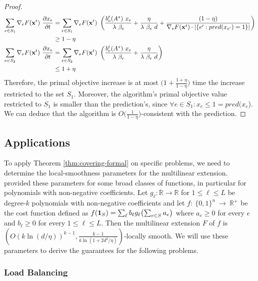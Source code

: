 \begin{proof}
\begin{align*}
\sum_{e \in S_{1}} \nabla_{e} F(\mathbf{x}^{t})\ \frac{\partial x_{e}}{ \partial t}
&= \sum_{e \in S_{1}} \nabla_{e} F(\mathbf{x}^{t})
	\ \left( \frac{b^{t}_{e}(A^{*}) \ x_{e}}{\lambda\ \beta_{e}} + \frac{\eta}{\lambda\ \beta_{e}\ d}
		 + \frac{(1 - \eta)}{\nabla_{e} F(\mathbf{x}^{t}) \cdot |\{e': pred(x_{e'}) = 1\}| }
 \right)\\
 &\geq 1 - \eta \\
 \sum_{e \in S_{2}} \nabla_{e} F(\mathbf{x}^{t})\ \frac{\partial x_{e}}{ \partial t}
&= \sum_{e \in S_{2}} \nabla_{e} F(\mathbf{x}^{t})
	\ \left( \frac{b^{t}_{e}(A^{*}) \ x_{e}}{\lambda\ \beta_{e}} + \frac{\eta}{\lambda\ \beta_{e}\ d} \right)\\
&\leq 1 + \eta
\end{align*}
Therefore, the primal objective increase is at most $\bigl(1 +  \frac{1 + \eta}{1 - \eta} \bigr)$ time the increase restricted to
the set $S_{1}$. Moreover, the algorithm's primal objective value restricted to $S_{1}$ is smaller than
the prediction's, since $\forall e \in S_{1} : x_{e} \leq 1 = pred(x_{e}$).
We can deduce that the algorithm is $O\bigl( \frac{1}{1 - \eta} \bigr)$-consistent with the prediction.
\end{proof}
\setcounter{theorem}{5}

\subsection{Applications}
To apply Theorem \ref{thm:covering-formal} on specific problems, we need to determine the local-smoothness parameters for the multilinear extension.
\cite{Thang20:Online-Primal-Dual} provided these parameters for some broad classes of functions, in particular for polynomials with non-negative coefficients. Let $g_{\ell}: \mathbb{R} \rightarrow \mathbb{R}$ for $1 \leq \ell \leq L$
be degree-$k$ polynomials with non-negative coefficients and let $f:~\{0,1\}^{n}~\rightarrow~\mathbb{R}^{+}$ be the cost function
defined as $f(\mathbf{1}_{S}) = \sum_{\ell} b_{\ell} g_{\ell}\bigl( \sum_{e \in S} a_{e} \bigr)$ where $a_{e} \geq 0$ for every
$e$ and $b_{\ell} \geq 0$ for every $1 \leq \ell \leq L$.
Then the multilinear extension $F$ of $f$ is $(O(k \ln(d/\eta))^{k-1}, \frac{k-1}{k \ln(1 + 2d^{2}/\eta)})$-locally smooth.
We will use these parameters to derive the guarantees for the following problems.

\subsubsection{Load Balancing}

